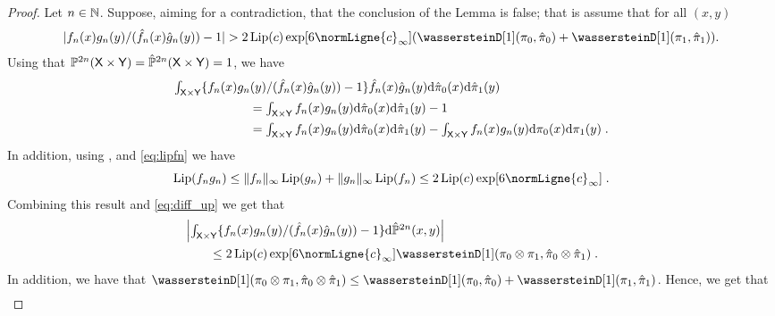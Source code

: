\documentclass[11pt,a4paper]{article}
\begin{document}
\begin{proof}
  Let $n \in \mathbb{N}$. 
  Suppose, aiming for a contradiction, that the conclusion of the Lemma is false; that is assume that for all $(x,y)$  
\begin{equation}\label{eq:contradition}
    |f_n(x) g_n(y) / (\hat{f}_n(x) \hat{g}_n(y)) - 1| >  2 \Lip(c) \exp[6 \normLigne{c}_\infty] (\wassersteinD[1](\pi_0, \hat{\pi}_0) + \wassersteinD[1](\pi_1, \hat{\pi}_1) ).
\end{equation} 
  Using that $\mathbb{P}^{2n}(\mathsf{X} \times \mathsf{Y}) =\hat{\mathbb{P}}^{2n}(\mathsf{X} \times \mathsf{Y}) =1$, we have
  \begin{align}
    \label{eq:diff_up}
    &\textstyle{ \int_{\mathsf{X}\times \mathsf{Y}} \{f_n(x) g_n(y) / (\hat{f}_n(x) \hat{g}_n(y)) - 1\}\hat{f}_n(x) \hat{g}_n(y)\mathrm{d}\hat{\pi}_0(x)\mathrm{d}\hat{\pi}_1(y) } \\
    &\qquad \qquad \qquad = \textstyle{\int_{\mathsf{X}\times \mathsf{Y}} f_n(x) g_n(y) \mathrm{d}\hat{\pi}_0(x)\mathrm{d}\hat{\pi}_1(y)} -1 \\
      &\qquad \qquad \qquad = \textstyle{\int_{\mathsf{X}\times \mathsf{Y}} f_n(x) g_n(y) \mathrm{d}\hat{\pi}_0(x)\mathrm{d}\hat{\pi}_1(y) - \int_{\mathsf{X}\times \mathsf{Y}} f_n(x) g_n(y) \mathrm{d}\pi_0(x)\mathrm{d}\pi_1(y)} \; . 
  \end{align}
  In addition, using ,  and \eqref{eq:lipfn} we have
  \begin{equation}
       \Lip (f_n g_n) \leq  \|f_n\|_\infty \Lip(g_n) + \|g_n\|_\infty \Lip(f_n) \leq 2 \Lip(c) \exp[6 \normLigne{c}_\infty] \eqsp . 
  \end{equation}
Combining this result and \eqref{eq:diff_up} we get that
\begin{align}
  &\abs{\textstyle{ \int_{\msx \times \msy} \{f_n(x) g_n(y) / (\hat{f}_n(x) \hat{g}_n(y)) - 1\}\rmd \hat{\Pbb}^{2n}(x,y) }}\\
  & \qquad \leq 2 \Lip(c) \exp[6 \normLigne{c}_\infty] \wassersteinD[1](\pi_0 \otimes \pi_1, \hat{\pi}_0 \otimes \hat{\pi}_1) \eqsp . 
\end{align}
In addition, we have that 
$\wassersteinD[1](\pi_0 \otimes \pi_1, \hat{\pi}_0 \otimes \hat{\pi}_1)\leq
\wassersteinD[1](\pi_0, \hat{\pi}_0) + \wassersteinD[1](\pi_1, \hat{\pi}_1)$.
Hence, we get that
\begin{align}

\end{align}
\end{proof}
\end{document}
